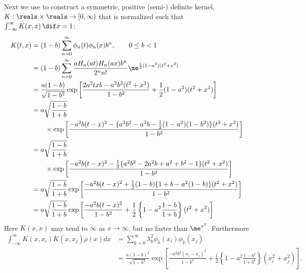 \documentclass[]{elsarticle}
\theoremstyle{definition}
\begin{document}
Next we use \label{Poissonkern} to construct a symmetric, positive (semi-) definite kernel, $K:\reals \times \reals \to [0,\infty)$ that is normalized such that $\int_{-\infty}^{\infty} K(x,x) \, \dif x =1$:
\begin{align}
\nonumber
K(t,x) & = (1-b) \sum_{n=0}^{\infty} \phi_n(t)\phi_n(x) b^n, \qquad 0 \le b < 1\\
\nonumber
& = (1-b) \sum_{n=0}^{\infty} \frac{a H_n(at) H_n(ax)  b^n}{2^n n!} \me^{\frac 12 (1-a^2)(t^2+x^2)}\\
\nonumber
& = \frac{a(1-b)}{\sqrt{1-b^2}} \exp\left[\frac{2a^2txb -a^2b^2(t^2+x^2)}{1-b^2} + \frac 12 (1-a^2)(t^2+x^2) \right]\\
\nonumber
& = a\sqrt{\frac{1-b}{1+b}} \\
\nonumber
& \qquad \times \exp\left[\frac{-a^2b(t-x)^2-\{a^2b^2-a^2b - \frac12 (1-a^2)(1-b^2)\} (t^2+x^2)}{1-b^2} \right]\\
\nonumber
& = a\sqrt{\frac{1-b}{1+b}} \\
\nonumber
& \qquad \times \exp\left[\frac{-a^2b(t-x)^2-\frac12\{a^2b^2-2a^2b + a^2 + b^2 - 1\} (t^2+x^2)}{1-b^2} \right]\\
\nonumber
& = a\sqrt{\frac{1-b}{1+b}} \exp\left[\frac{-a^2b(t-x)^2+\frac12(1-b)\{1+ b - a^2(1-b)\} (t^2+x^2)}{1-b^2} \right]\\
& = a\sqrt{\frac{1-b}{1+b}} \exp\left[\frac{-a^2b(t-x)^2}{1-b^2} +\frac12\left\{1 - a^2\frac{1-b}{1+b} \right\} (t^2+x^2) \right] \label{Kernelab}
\end{align}
Here $K(x,x)$ may tend to $\infty$ as $x \to \infty$, but no faster than $\me^{x^2}$. Furthermore
\begin{align*}
\int_{-\infty}^\infty K(x,x_i)K(x,x_j)\rho(x)dx &= \sum_{k=0}^\infty\lambda_k^2\phi_k(x_i)\phi_k(x_j)\\
&= \frac{a(1-b)^2}{\sqrt{1-b^4}}\exp\left[\frac{-a^2b^2(x_i-x_j)^2}{1-b^4} +\frac12\left\{1 - a^2\frac{1-b^2}{1+b^2} \right\} (x_i^2+x_j^2) \right].
\end{align*}
\end{document}
